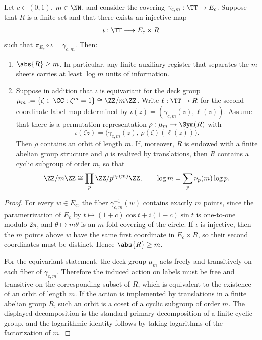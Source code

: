 \begin{proposition}\label{prop:elliptic-gate-minimal-register}
Let \(c\in(0,1)\), \(m\in\NN\), and consider the covering \(\gamma_{c,m}:\TT\to E_c\). Suppose that \(R\) is a finite set and that there exists an injective map
\[
\iota:\TT\longrightarrow E_c\times R
\]
such that \(\pi_{E_c}\circ\iota=\gamma_{c,m}\). Then:
\begin{enumerate}
  \item \(\abs{R}\ge m\). In particular, any finite auxiliary register that separates the \(m\) sheets carries at least \(\log m\) units of information.

  \item Suppose in addition that \(\iota\) is equivariant for the deck group \(\mu_m:=\{\zeta\in\CC:\zeta^m=1\}\cong\ZZ/m\ZZ\).  Write \(\ell:\TT\to R\) for the second-coordinate label map determined by \(\iota(z)=(\gamma_{c,m}(z),\ell(z))\).  Assume that there is a permutation representation \(\rho:\mu_m\to\Sym(R)\) with
  \[
  \iota(\zeta z)=\bigl(\gamma_{c,m}(z),\,\rho(\zeta)(\ell(z))\bigr).
  \]
  Then \(\rho\) contains an orbit of length \(m\). If, moreover, \(R\) is endowed with a finite abelian group structure and \(\rho\) is realized by translations, then \(R\) contains a cyclic subgroup of order \(m\), so that
  \[
  \ZZ/m\ZZ\cong \prod_{p}\ZZ/p^{\nu_p(m)}\ZZ,
  \qquad
  \log m=\sum_p \nu_p(m)\log p.
  \]
\end{enumerate}
\end{proposition}

\begin{proof}
For every \(w\in E_c\), the fiber \(\gamma_{c,m}^{-1}(w)\) contains exactly \(m\) points, since the parametrization of \(E_c\) by \(t\mapsto (1+c)\cos t+i(1-c)\sin t\) is one-to-one modulo \(2\pi\), and \(\theta\mapsto m\theta\) is an \(m\)-fold covering of the circle. If \(\iota\) is injective, then the \(m\) points above \(w\) have the same first coordinate in \(E_c\times R\), so their second coordinates must be distinct. Hence \(\abs{R}\ge m\).

For the equivariant statement, the deck group \(\mu_m\) acts freely and transitively on each fiber of \(\gamma_{c,m}\). Therefore the induced action on labels must be free and transitive on the corresponding subset of \(R\), which is equivalent to the existence of an orbit of length \(m\). If the action is implemented by translations in a finite abelian group \(R\), such an orbit is a coset of a cyclic subgroup of order \(m\). The displayed decomposition is the standard primary decomposition of a finite cyclic group, and the logarithmic identity follows by taking logarithms of the factorization of \(m\).
\end{proof}

